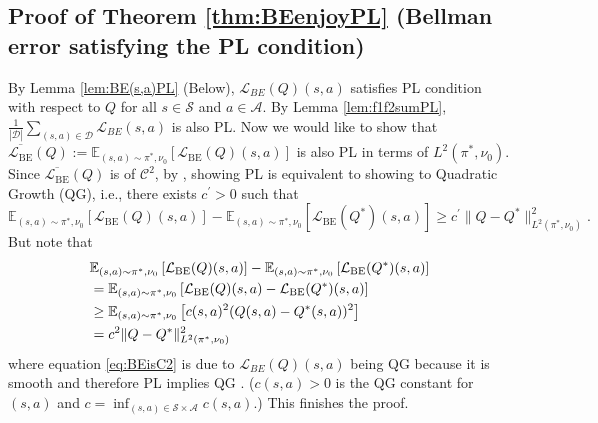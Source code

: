 \subsection{Proof of Theorem \ref{thm:BEenjoyPL} (Bellman error satisfying the PL condition)}
By Lemma \ref{lem:BE(s,a)PL} (Below), $\mathcal{L}_{BE}(Q)(s,a)$ satisfies PL condition with respect to $Q$ for all $s\in\mathcal{S}$ and $a\in\mathcal{A}$. By Lemma \ref{lem:f1f2sumPL}, $\frac{1}{|\mathcal{D}|}\sum_{(s,a)\in\mathcal{D}}\mathcal{L}_{BE}(s,a)$ is also PL. Now we would like to show that $\overline{\mathcal{L}_{\mathrm{BE}}}(Q):=\mathbb{E}_{(s, a) \sim \pi^*, \nu_0}\left[\mathcal{L}_{\mathrm{BE}}(Q)(s, a)\right]$ is also PL in terms of $L^2(\pi^\ast, \nu_0)$. Since $\overline{\mathcal{L}_{\mathrm{BE}}}(Q)$ is of $\mathcal{C}^2$, by \cite{rebjock2023fast}, showing PL is equivalent to showing to Quadratic Growth (QG), i.e., there exists $c^\prime>0$ such that
$$
\mathbb{E}_{(s, a) \sim \pi^*, \nu_0}\left[\mathcal{L}_{\mathrm{BE}}(Q)(s, a)\right]-\mathbb{E}_{(s, a) \sim \pi^*, \nu_0}\left[\mathcal{L}_{\mathrm{BE}}(Q^\ast)(s, a)\right] \ge c^\prime\|Q-Q^\ast\|^2_{L^2(\pi^\ast, \nu_0)}.
$$
But note that
\begin{align}
    &\mathbb{E}_{(s, a) \sim \pi^*, \nu_0}\left[\mathcal{L}_{\mathrm{BE}}(Q)(s, a)\right]-\mathbb{E}_{(s, a) \sim \pi^*, \nu_0}\left[\mathcal{L}_{\mathrm{BE}}(Q^\ast)(s, a)\right] \notag
    \\
    &= \mathbb{E}_{(s, a) \sim \pi^*, \nu_0}\left[\mathcal{L}_{\mathrm{BE}}(Q)(s, a)-\mathcal{L}_{\mathrm{BE}}(Q^\ast)(s, a)\right] \notag
    \\
    &\ge \mathbb{E}_{(s, a) \sim \pi^*, \nu_0}\left[c(s,a)^2(Q(s,a)-Q^\ast(s,a))^2\right] \label{eq:BEisC2}
    \\
    &=c^2\|Q-Q^\ast\|^2_{L^2(\pi^\ast, \nu_0)} \notag
\end{align}
where equation \eqref{eq:BEisC2} is due to $\mathcal{L}_{BE}(Q)(s,a)$ being QG because it is smooth and therefore PL implies QG \citep{liao2024error}. ($c(s,a)>0$ is the QG constant for $(s,a)$ and $c = \inf_{(s,a)\in \mathcal{S}\times\mathcal{A}} c(s,a)$.) This finishes the proof.
\QED


